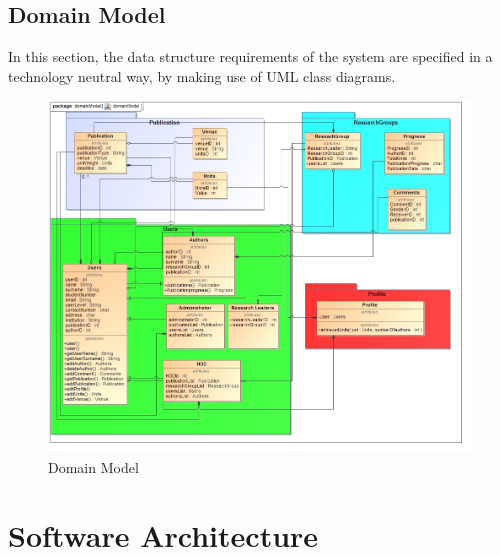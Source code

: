 \documentclass[a4paper,12pt]{article}
\begin{document}
\newpage
\subsection{Domain Model}

In this section, the data structure requirements of the system are specified in a technology neutral way, by making use of UML class diagrams.

\begin{figure}[H]
    \centering
    \caption{Domain Model}
    \includegraphics[width=1\textwidth]{domainModel.jpg}
\end{figure}


\newpage
\section{Software Architecture}
\end{document}

